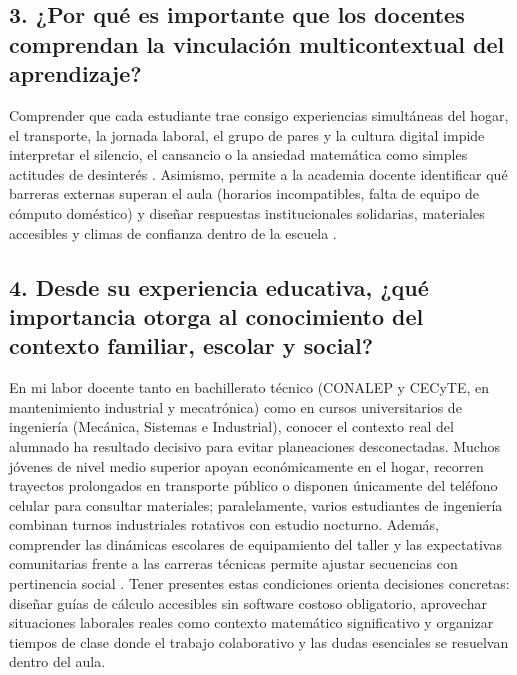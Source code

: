 \documentclass[spanish,letterpaper,oneside]{article}
\begin{document}
\subsection*{3. ¿Por qué es importante que los docentes comprendan la vinculación multicontextual del aprendizaje?}
Comprender que cada estudiante trae consigo experiencias simultáneas del hogar, el transporte, la jornada laboral, el grupo de pares y la cultura digital impide interpretar el silencio, el cansancio o la ansiedad matemática como simples actitudes de desinterés \citep{tong2023bioecological}. Asimismo, permite a la academia docente identificar qué barreras externas superan el aula (horarios incompatibles, falta de equipo de cómputo doméstico) y diseñar respuestas institucionales solidarias, materiales accesibles y climas de confianza dentro de la escuela \citep{meirieu2020escuela}.

\subsection*{4. Desde su experiencia educativa, ¿qué importancia otorga al conocimiento del contexto familiar, escolar y social?}
En mi labor docente tanto en bachillerato técnico (CONALEP y CECyTE, en mantenimiento industrial y mecatrónica) como en cursos universitarios de ingeniería (Mecánica, Sistemas e Industrial), conocer el contexto real del alumnado ha resultado decisivo para evitar planeaciones desconectadas. Muchos jóvenes de nivel medio superior apoyan económicamente en el hogar, recorren trayectos prolongados en transporte público o disponen únicamente del teléfono celular para consultar materiales; paralelamente, varios estudiantes de ingeniería combinan turnos industriales rotativos con estudio nocturno. Además, comprender las dinámicas escolares de equipamiento del taller y las expectativas comunitarias frente a las carreras técnicas permite ajustar secuencias con pertinencia social \citep{conalep2025mecatronica}. Tener presentes estas condiciones orienta decisiones concretas: diseñar guías de cálculo accesibles sin software costoso obligatorio, aprovechar situaciones laborales reales como contexto matemático significativo y organizar tiempos de clase donde el trabajo colaborativo y las dudas esenciales se resuelvan dentro del aula.
\end{document}
